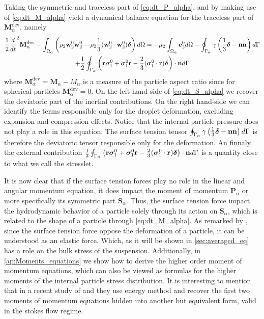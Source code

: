 Taking the symmetric and traceless part of \ref{eq:dt_P_alpha}, and by making use of \ref{eq:dt_M_alpha} yield a dynamical balance equation for the traceless part of $\textbf{M}_\alpha^\text{dev}$, namely
\begin{multline}    
    \frac{1}{2}\frac{d}{dt}^2{\textbf{M}_\alpha^\text{dev}}
    - \int_{\Omega_\alpha} \left(
        \rho_2\textbf{w}_2^0 \textbf{w}_2^0
        - \rho_2\frac{1}{3}(\textbf{w}_2^0 \cdot \textbf{w}_2^0)\bm\delta\right) d\Omega
    =  
        - \mu_2 \int_{\Omega_\alpha} \textbf{e}_2^0 d\Omega
        - \oint_{\Gamma_\alpha} \gamma\left(\frac{1}{3}\bm\delta-\textbf{nn}\right) d\Gamma\\
        + \frac{1}{2}\oint_{\Gamma_\alpha} \left(\textbf{r}\bm\sigma_1^0+ \bm\sigma_1^0\textbf{r} - \frac{2}{3}(\bm\sigma_1^0\cdot \textbf{r})\bm\delta\right)\cdot \textbf{n} d\Gamma
    \label{eq:dt_S_alpha}
\end{multline}
where $\textbf{M}^\text{dev}_\alpha = \textbf{M}_\alpha - M_\alpha$ is a measure of the particle aspect ratio since for spherical particles $\textbf{M}^\text{dev}_\alpha = 0$.
On the left-hand side of \ref{eq:dt_S_alpha} we recover the deviatoric part of the inertial contributions. 
On the right hand-side we can identify the terms responsible only for the droplet deformation, excluding expansion and compression effects.
Notice that the internal particle pressure does not play a role in this equation.  
The surface tension tensor $\oint_{\Gamma_\alpha} \gamma\left(\frac{1}{3}\bm\delta-\textbf{nn}\right) d\Gamma$ is therefore the deviatoric tensor responsible only for the deformation. 
An finnaly the external contribution $\frac{1}{2}\oint_{\Gamma_\alpha} \left(\textbf{r}\bm\sigma_1^0+ \bm\sigma_1^0\textbf{r} - \frac{2}{3}(\bm\sigma_1^0\cdot \textbf{r})\bm\delta\right)\cdot \textbf{n} d\Gamma$ is a quantity close to what we call the stresslet. 

It is now clear that if the surface tension forces play no role in the linear and angular momentum equation, it does impact the moment of momentum $\textbf{P}_\alpha$ or more specifically its symmetric part $\textbf{S}_\alpha$.
Thus, the surface tension force impact the hydrodynamic behavior of a particle solely through its action on $\textbf{S}_\alpha$, which is related to the shape of a particle through \ref{eq:dt_M_alpha}.
As remarked by \citet{batchelor1970stress}, since the surface tension force oppose the deformation of a particle, it can be understood as an elastic force. 
Which, as it will be shown in \ref{sec:averaged_eq} has a role on the bulk stress of the suspension. 
Additionally, in \ref{ap:Moments_equations} we show how to derive the higher order moment of momentum equations, which can also be viewed as formulas for the higher moments of the internal particle stress distribution. 
It is interesting to mention that in a recent study of \citet{dolata2021faxen} and \citet{zhou} they use energy method and recover the first two moments of momentum equations hidden into another but equivalent form, valid in the stokes flow regime. 



